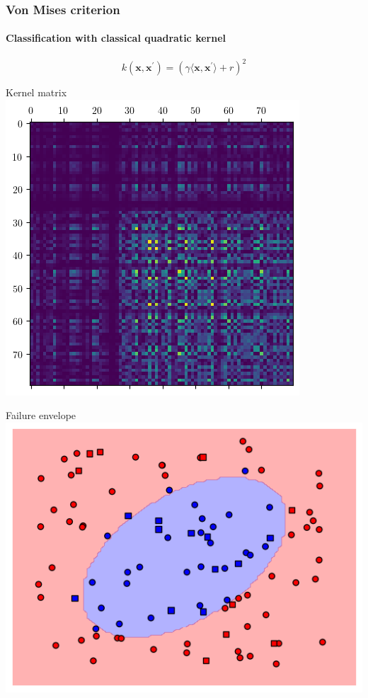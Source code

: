 \documentclass{beamer}
\begin{document}
    \begin{frame}
        \frametitle{Von Mises criterion}
        \framesubtitle{Classification with classical quadratic kernel}
        
        \centering
        \[
            k\left( \mathbf{x}, \mathbf{x}^\prime \right) = \left( \gamma\langle \mathbf{x}, \mathbf{x}^\prime \rangle + r \right)^2
        \]

        \begin{minipage}{.45\textwidth}
            \centering
            Kernel matrix
            \includegraphics[width=\textwidth]{pics/quad-kernel-matrix.png}
        \end{minipage}
        \begin{minipage}{.45\textwidth}
            \centering
            Failure envelope
            \includegraphics[width=\textwidth]{pics/quad-kernel-envelope.png}
        \end{minipage}
    \end{frame}
    
\end{document}
